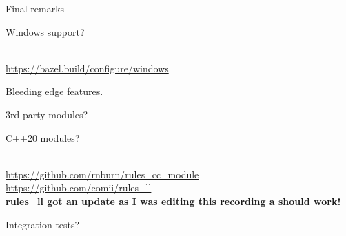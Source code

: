 \documentclass[aspectratio=169]{beamer}
\begin{document}
\begin{frame}{}
    \begin{center}
        \begin{Huge}Final remarks\end{Huge}
    \end{center}
\end{frame}

\begin{frame}{}
    \begin{center}
        \begin{Huge}Windows support?\end{Huge}\\
        \href{https://bazel.build/configure/windows}{https://bazel.build/configure/windows}
    \end{center}
\end{frame}

\begin{frame}{}
    \begin{center}
        \begin{Huge}Bleeding edge features.\end{Huge}
    \end{center}
\end{frame}

\begin{frame}{}
    \begin{center}
        \begin{Huge}3rd party modules?\end{Huge}
    \end{center}
\end{frame}

\begin{frame}{}
    \begin{center}
        \begin{Huge}C++20 modules?\end{Huge}\\
        \href{https://github.com/rnburn/rules_cc_module}{https://github.com/rnburn/rules\_cc\_module}\\
        \href{https://github.com/eomii/rules_ll}{https://github.com/eomii/rules\_ll}\\
        \textbf{rules\_ll got an update as I was editing this recording a should work!}
\end{center}
\end{frame}

\begin{frame}{}
    \begin{center}
        \begin{Huge}Integration tests?\end{Huge}
    \end{center}
\end{frame}
\end{document}
